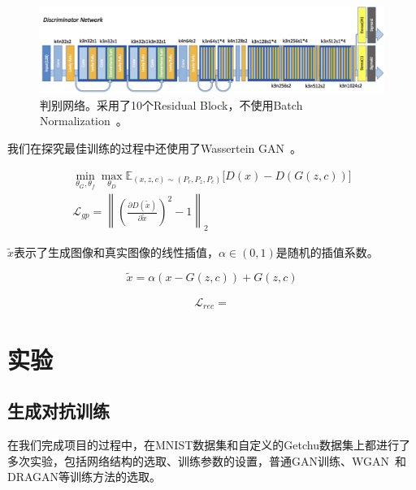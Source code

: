\documentclass[a4paper,12pt,UTF8]{ctexart}
\newcommand{\norm}[1]{\left\lVert#1\right\rVert}
\newcommand{\kai}{\CJKfamily{zhkai}}	%
\begin{document}
\begin{figure}[H]
  \centering
  \includegraphics[width=1\linewidth]{figs/mod_disc.png}
  \caption{\kai 判别网络。采用了10个Residual Block，不使用Batch Normalization~\cite{ioffe2015batch}。}
  \label{fig:discriminator}
\end{figure}

我们在探究最佳训练的过程中还使用了Wassertein GAN~\cite{2017arXiv170107875A}。


\begin{align}
  \min_{\theta_G,\theta_f} \max_{\theta_D} \mathbb{E}_{(x, z, c) \sim (P_r, P_z, P_c)} \Big[ D(x) - D(G(z, c))\Big] \\
  \mathcal{L}_{gp} = \norm{\left(\frac{\partial D(\tilde x)}{\partial \tilde x}\right)^2 - 1 }_2
\end{align}

$\tilde x$表示了生成图像和真实图像的线性插值，$\alpha \in (0, 1)$是随机的插值系数。

\begin{equation}
  \tilde x = \alpha (x - G(z, c)) + G(z, c)
\end{equation}




\begin{equation}
  \begin{aligned}
    \mathcal{L}_{rec} = 
  \end{aligned}
\end{equation}

\section{实验}

\subsection{生成对抗训练}

在我们完成项目的过程中，在MNIST数据集和自定义的Getchu数据集上都进行了多次实验，包括网络结构的选取、训练参数的设置，普通GAN训练、WGAN~\cite{2017arXiv170107875A}和DRAGAN等训练方法的选取。
\end{document}
